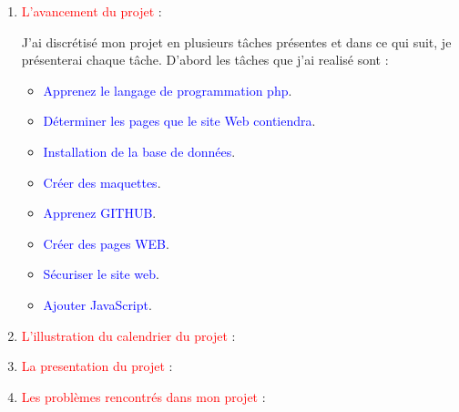 \documentclass{article}
\begin{document}
\begin{enumerate}
   
   
   
   
   
   
   \item \textcolor{red}{\huge L'avancement du projet} :
   
   
   \vspace{1.2cm}
        \setlength{\parindent}{1cm} J'ai discrétisé mon projet en plusieurs tâches présentes et dans ce qui suit, je présenterai chaque tâche.
     D'abord les tâches que j'ai realisé sont :
    \begin{itemize}
     
     \item \textcolor{blue}{Apprenez le langage de programmation php}.
     \item \textcolor{blue}{Déterminer les pages que le site Web contiendra}.
     \item \textcolor{blue}{Installation de la base de données}.
     \item \textcolor{blue}{Créer des maquettes}.
     \item \textcolor{blue}{Apprenez GITHUB}.
     \item \textcolor{blue}{Créer des pages WEB}.
     \item \textcolor{blue}{Sécuriser le site web}.
     \item \textcolor{blue}{Ajouter JavaScript}.
   \end{itemize}
   
   
   
   
   \item \textcolor{red}{\huge L'illustration du calendrier du projet} :  
   
   \item \textcolor{red}{\huge La presentation du projet} :  
   \vspace{1cm}
   

   \item \textcolor{red}{\huge Les problèmes rencontrés dans mon projet} :
   
  
\end{enumerate}
\end{document}
